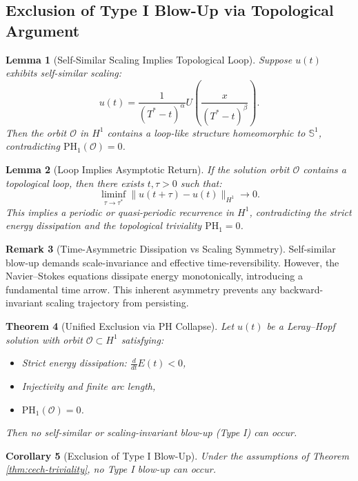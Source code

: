 \documentclass[11pt]{article}
\newtheorem{theorem}{Theorem}[section]
\newtheorem{lemma}[theorem]{Lemma}
\newtheorem{corollary}[theorem]{Corollary}
\theoremstyle{definition}
\newtheorem{remark}[theorem]{Remark}
\begin{document}
\subsection{Exclusion of Type I Blow-Up via Topological Argument}

\begin{lemma}[Self-Similar Scaling Implies Topological Loop]
Suppose $u(t)$ exhibits self-similar scaling:
\[
 u(t) = \frac{1}{(T^* - t)^\alpha} U\left( \frac{x}{(T^* - t)^\beta} \right).
\]
Then the orbit $\mathcal{O}$ in $H^1$ contains a loop-like structure homeomorphic to $\mathbb{S}^1$, contradicting $\mathrm{PH}_1(\mathcal{O}) = 0$.
\end{lemma}

\begin{lemma}[Loop Implies Asymptotic Return]
If the solution orbit $\mathcal{O}$ contains a topological loop, then there exists $t, \tau > 0$ such that:
\[
\liminf_{\tau \to \tau^*} \|u(t + \tau) - u(t)\|_{H^1} \to 0.
\]
This implies a periodic or quasi-periodic recurrence in $H^1$, contradicting the strict energy dissipation and the topological triviality $\mathrm{PH}_1 = 0$.
\end{lemma}

\begin{remark}[Time-Asymmetric Dissipation vs Scaling Symmetry]
Self-similar blow-up demands scale-invariance and effective time-reversibility. However, the Navier--Stokes equations dissipate energy monotonically, introducing a fundamental time arrow. This inherent asymmetry prevents any backward-invariant scaling trajectory from persisting.
\end{remark}

\begin{theorem}[Unified Exclusion via PH Collapse]
Let $u(t)$ be a Leray--Hopf solution with orbit $\mathcal{O} \subset H^1$ satisfying:
\begin{itemize}
  \item Strict energy dissipation: $\frac{d}{dt} E(t) < 0$,
  \item Injectivity and finite arc length,
  \item $\mathrm{PH}_1(\mathcal{O}) = 0$.
\end{itemize}
Then no self-similar or scaling-invariant blow-up (Type I) can occur.
\end{theorem}

\begin{corollary}[Exclusion of Type I Blow-Up]
Under the assumptions of Theorem \ref{thm:cech-triviality}, no Type I blow-up can occur.
\end{corollary}
\end{document}
